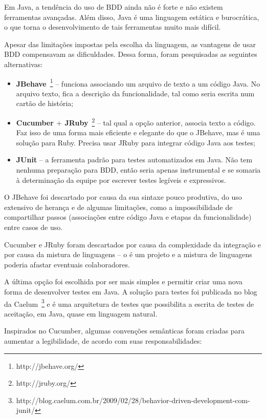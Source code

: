 Em Java, a tendência do uso de BDD ainda não é forte e não existem ferramentas avançadas. Além disso, Java é uma linguagem estática e burocrática, o que torna o desenvolvimento de tais ferramentas muito mais difícil. 

Apesar das limitações impostas pela escolha da linguagem, as vantagens de usar BDD compensavam as dificuldades. Dessa forma, foram pesquisadas as seguintes alternativas:

\begin{itemize}
	\item{\textbf{JBehave}~\footnote{http://jbehave.org/} -- funciona associando um arquivo de texto a um código Java. No arquivo texto, fica a descrição da funcionalidade, tal como seria escrita num cartão de história;}
	\item{\textbf{Cucumber $+$ JRuby}~\footnote{http://jruby.org/} -- tal qual a opção anterior, associa texto a código. Faz isso de uma forma mais eficiente e elegante do que o JBehave, mas é uma solução para Ruby. Precisa usar JRuby para integrar código Java aos testes;}
	\item{\textbf{JUnit} -- a ferramenta padrão para testes automatizados em Java. Não tem nenhuma preparação para BDD, então seria apenas instrumental e se somaria à determinação da equipe por escrever testes legíveis e expressivos.}
\end{itemize}

O JBehave foi descartado por causa da sua sintaxe pouco produtiva, do uso extensivo de herança e de algumas limitações, como a impossibilidade de compartilhar passos (associações entre código Java e etapas da funcionalidade) entre casos de uso.

Cucumber e JRuby foram descartados por causa da complexidade da integração e por causa da mistura de linguagens -- o \calopsita{} é um projeto \opensource{} e a mistura de linguagens poderia afastar eventuais colaboradores.

A última opção foi escolhida por ser mais simples e permitir criar uma nova forma de desenvolver testes em Java. A solução para testes foi publicada no blog da Caelum~\footnote{http://blog.caelum.com.br/2009/02/28/behavior-driven-development-com-junit/} e é uma arquitetura de testes que possibilita a escrita de testes de aceitação, em Java, quase em linguagem natural. 

Inspirados no Cucumber, algumas convenções semânticas foram criadas para aumentar a legibilidade, de acordo com suas responsabilidades:

